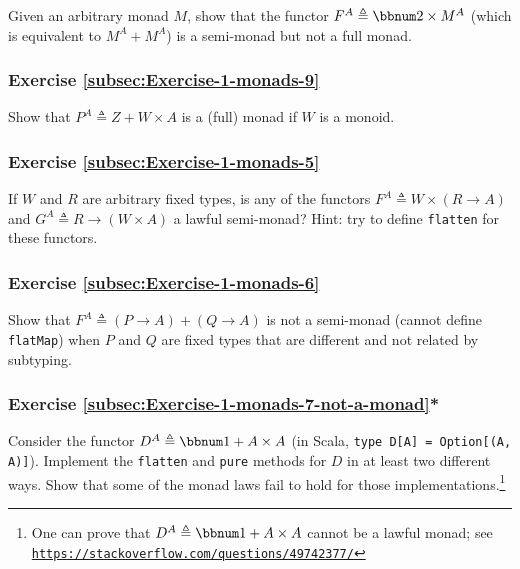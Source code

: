 Given an arbitrary monad $M$, show that the functor $F^{A}\triangleq\bbnum 2\times M^{A}$
(which is equivalent to $M^{A}+M^{A}$) is a semi-monad but not a
full monad.

\subsubsection{Exercise \label{subsec:Exercise-1-monads-9}\ref{subsec:Exercise-1-monads-9}}

Show that $P^{A}\triangleq Z+W\times A$ is a (full) monad if $W$
is a monoid.

\subsubsection{Exercise \label{subsec:Exercise-1-monads-5}\ref{subsec:Exercise-1-monads-5}}

If $W$ and $R$ are arbitrary fixed types, is any of the functors
$F^{A}\triangleq W\times\left(R\rightarrow A\right)$ and $G^{A}\triangleq R\rightarrow\left(W\times A\right)$
a lawful semi-monad? Hint: try to define \lstinline!flatten! for
these functors.

\subsubsection{Exercise \label{subsec:Exercise-1-monads-6}\ref{subsec:Exercise-1-monads-6}}

Show that $F^{A}\triangleq\left(P\rightarrow A\right)+\left(Q\rightarrow A\right)$
is not a semi-monad (cannot define \lstinline!flatMap!) when $P$
and $Q$ are fixed types that are different and not related by subtyping.

\subsubsection{Exercise \label{subsec:Exercise-1-monads-7-not-a-monad}\ref{subsec:Exercise-1-monads-7-not-a-monad}{*}}

Consider the functor $D^{A}\triangleq\bbnum 1+A\times A$ (in Scala,
\lstinline!type D[A] = Option[(A, A)]!). Implement the \lstinline!flatten!
and \lstinline!pure! methods for $D$ in at least two different ways.
Show that some of the monad laws fail to hold for those implementations.\footnote{One can prove that $D^{A}\triangleq\bbnum 1+A\times A$ cannot be
a lawful monad; see \texttt{\href{https://stackoverflow.com/questions/49742377/}{https://stackoverflow.com/questions/49742377/}}}

